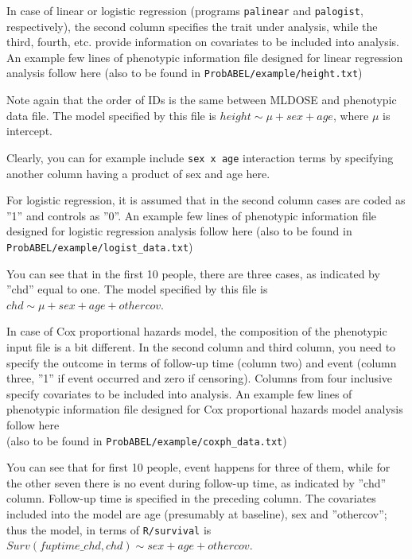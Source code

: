 \documentclass[12pt,a4paper]{article}
\begin{document}
In case of linear or logistic regression (programs \texttt{palinear} and 
\texttt{palogist}, respectively), the second column specifies the trait 
under analysis, while the third, fourth, etc. 
provide information on covariates to be included into analysis. 
An example few lines of phenotypic information file designed for 
linear regression analysis follow here (also 
to be found in \texttt{ProbABEL/example/height.txt})



Note again that the order of IDs is the same between MLDOSE and phenotypic 
data file. The model specified by this file is $height \sim \mu + sex + age$, 
where $\mu$ is intercept.  

Clearly, you can for example include \texttt{sex x age} interaction terms by 
specifying another column having a product of sex and age here.

For logistic regression, it is assumed that in the second column cases are 
coded as ''1'' and controls as ''0''. An example few lines of phenotypic 
information file designed for logistic regression analysis follow here (also 
to be found in \texttt{ProbABEL/example/logist\_data.txt})



You can see that in the first 10 people, there are three cases, as indicated 
by ''chd'' equal to one. The model specified by this file 
is $chd \sim \mu + sex + age + othercov$.  

In case of Cox proportional hazards model, the composition of the 
phenotypic input file is a bit different. In the second column and 
third column, you need to specify the outcome in terms of follow-up 
time (column two) and event (column three, ''1'' if event occurred 
and zero if censoring). Columns from four inclusive specify covariates 
to be included into analysis. An example few lines of phenotypic 
information file designed for Cox proportional hazards model 
analysis follow here \\(also to be found in
\texttt{ProbABEL/example/coxph\_data.txt})



You can see that for first 10 people, event happens for three of 
them, while for the other seven there is no event during follow-up 
time, as indicated 
by ''chd'' column. Follow-up time is specified in the preceding 
column. The covariates included into the model are age (presumably 
at baseline), sex and ''othercov''; thus the model, in terms of 
\texttt{R/survival} is \\ $Surv(fuptime\_chd, chd) \sim sex + age + othercov$.  
\end{document}

